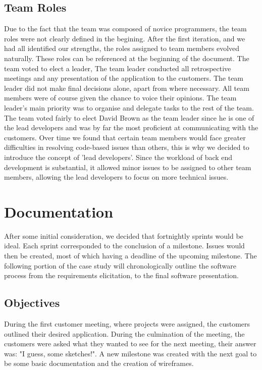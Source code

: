 \documentclass{l3proj}
\begin{document}
\subsection{Team Roles}
\label{sec:roles}

Due to the fact that the team was composed of novice programmers, the team roles were not clearly defined in the begining. After the first iteration, and we had all identified our strengths, the roles assigned to team members evolved naturally. These roles can be referenced at the beginning of the document. The team voted to elect a leader, The team leader conducted all retrospective meetings and any presentation of the application to the customers. The team leader did not make final decisions alone, apart from where necessary. All team members were of course given the chance to voice their opinions. The team leader's main priority was to organise and delegate tasks to the rest of the team. The team voted fairly to elect David Brown as the team leader since he is one of the lead developers and was by far the most proficient at communicating with the customers. Over time we found that certain team members would face greater difficulties in resolving code-based issues than others, this is why we decided to introduce the concept of 'lead developers'. Since the workload of back end development is substantial, it allowed minor issues to be assigned to other team members, allowing the lead developers to focus on more technical issues.

\section{Documentation}
\label{documentation}

After some initial consideration, we decided that fortnightly sprints would be ideal. Each sprint corresponded to the conclusion of a milestone. Issues would then be created, most of which having a deadline of the upcoming milestone. The following portion of the case study will chronologically outline the software process from the requirements elicitation, to the final software presentation.

\subsection{Objectives}
\label{sec:objectives}

During the first customer meeting, where projects were assigned, the customers outlined their desired application. During the culmination of the meeting, the customers were asked what they wanted to see for the next meeting, their answer was: "I guess, some sketches!". A new milestone was created with the next goal to be some basic documentation and the creation of wireframes.
\end{document}
